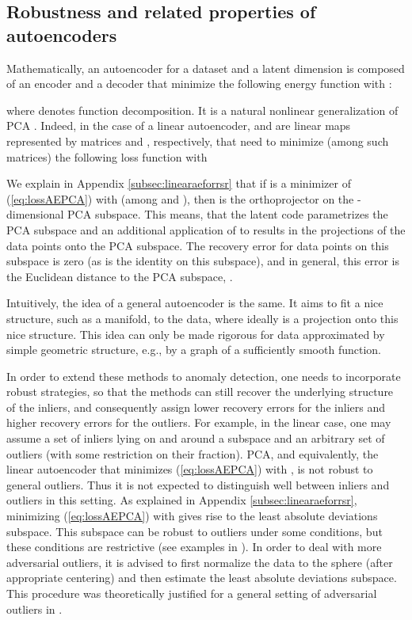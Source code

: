 \documentclass{article} \usepackage{iclr2020_conference,times}
\def\eqref#1{(\ref{#1})}
\begin{document}
\subsection{Robustness and related properties of autoencoders} 
\label{sec:heuristic}
Mathematically, an autoencoder for a dataset  and a latent dimension  is composed of an encoder  and a decoder  that minimize the following energy function with :

where  denotes function decomposition.
It is a natural nonlinear generalization of PCA \citep{goodfellow2016deep}. Indeed, in the case of a linear autoencoder,  and  are linear maps represented by  matrices   and , respectively, that need to minimize (among such matrices) the following loss function with  



We explain in Appendix \ref{subsec:linearaeforrsr} that if   is a minimizer of \eqref{eq:lossAEPCA} with  (among   and ), then  is the orthoprojector on the -dimensional PCA subspace. This means, that the latent code
 parametrizes the PCA subspace and an additional application of
 to  results in the projections of the data points  onto the PCA subspace. The recovery error for data points on this subspace is zero (as  is the identity on this subspace), and in general, this error is the Euclidean distance to the PCA subspace, .




Intuitively, the idea of a general autoencoder is the same. It aims to fit a nice structure, such as a  manifold,  to the data, where ideally  is a projection onto this nice structure. This idea can only be made rigorous for data approximated by simple geometric structure, e.g., by a graph of a sufficiently smooth function.

In order to extend these methods to anomaly detection, one needs to incorporate robust strategies, so that the methods can still recover the underlying structure of the inliers, and consequently assign lower recovery errors for the inliers and higher recovery errors for the outliers.
For example, in the linear case, one may assume a set of inliers lying on and around a subspace and an arbitrary set of outliers (with some restriction on their fraction). PCA, and equivalently, the linear autoencoder that minimizes \eqref{eq:lossAEPCA} with , is not robust to general outliers. Thus it is not expected to distinguish well between inliers and outliers in this setting. As explained in Appendix \ref{subsec:linearaeforrsr}, minimizing \eqref{eq:lossAEPCA} with  gives rise to the least absolute deviations subspace. This subspace can be robust to outliers under some conditions, but these conditions are restrictive (see examples in \citet{lp_recovery_part1_11}). In order to deal with more adversarial outliers, it is advised to first normalize the data to the sphere (after appropriate centering) and then estimate the least absolute deviations subspace. This procedure was theoretically justified for a general setting of adversarial outliers in \citet{maunu2019robust}. 
\end{document}
